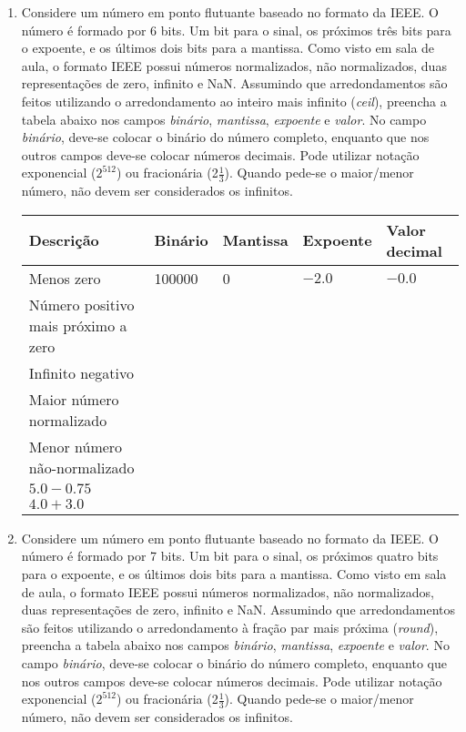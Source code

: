 \begin{enumerate}[resume]
    \item
    Considere um número em ponto flutuante baseado no formato da IEEE.
    O número é formado por 6 bits. 
    Um bit para o sinal, 
    os próximos três bits para o expoente,
    e os últimos dois bits para a mantissa.
    Como visto em sala de aula, o formato IEEE possui números normalizados,
    não normalizados, duas representações de zero, infinito e NaN.
    Assumindo que arredondamentos são feitos utilizando
    o arredondamento ao inteiro mais infinito (\textit{ceil}),
    preencha a tabela abaixo nos campos 
    \textit{binário}, \textit{mantissa}, \textit{expoente} e \textit{valor}.
    No campo \textit{binário}, deve-se colocar o binário do número completo,
    enquanto que nos outros campos deve-se colocar números decimais.
    Pode utilizar notação exponencial ($2^{512}$) ou fracionária (2$\frac{1}{3}$).
    Quando pede-se o maior/menor número, não devem ser considerados os infinitos.

    \begin{table}[H]
        \begin{tabular}{|l|l|l|l|l|}
            \hline
            \textbf{Descrição}  & 
            \textbf{Binário}    & 
            \textbf{Mantissa}   &
            \textbf{Expoente}   &
            \textbf{Valor decimal} \\\hline
            Menos zero & 100000 & 0 & $-2.0$ & $-0.0$ \\\hline
            Número positivo mais próximo a zero & & & & \\\hline
            Infinito negativo & & & & \\\hline
            Maior número normalizado & & & & \\\hline
            Menor número não-normalizado & & & & \\\hline
            $5.0 - 0.75$ & & & & \\\hline
            $4.0 + 3.0$ & & & & \\
            \hline
        \end{tabular}
    \end{table}

    \item
    Considere um número em ponto flutuante baseado no formato da IEEE.
    O número é formado por 7 bits. 
    Um bit para o sinal, 
    os próximos quatro bits para o expoente,
    e os últimos dois bits para a mantissa.
    Como visto em sala de aula, o formato IEEE possui números normalizados,
    não normalizados, duas representações de zero, infinito e NaN.
    Assumindo que arredondamentos são feitos utilizando
    o arredondamento à fração par mais próxima (\textit{round}),
    preencha a tabela abaixo nos campos 
    \textit{binário}, \textit{mantissa}, \textit{expoente} e \textit{valor}.
    No campo \textit{binário}, deve-se colocar o binário do número completo,
    enquanto que nos outros campos deve-se colocar números decimais.
    Pode utilizar notação exponencial ($2^{512}$) ou fracionária (2$\frac{1}{3}$).
    Quando pede-se o maior/menor número, não devem ser considerados os infinitos.


\end{enumerate}
